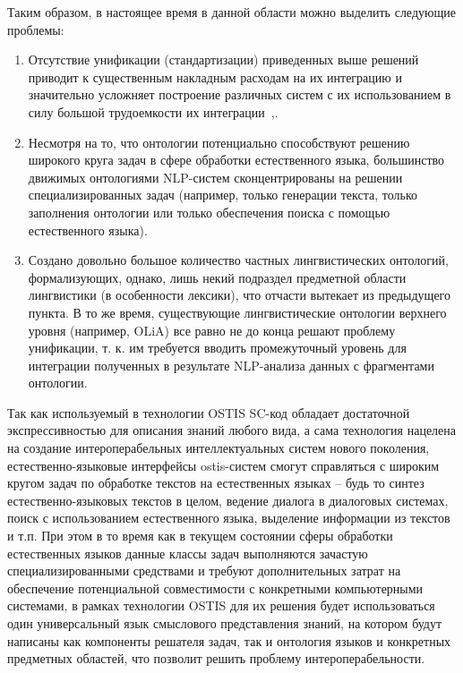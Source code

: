 Таким образом, в настоящее время в данной области можно выделить следующие проблемы:
\begin{enumerate}
    \item Отсутствие унификации (стандартизации) приведенных выше решений приводит к существенным накладным расходам на их интеграцию и значительно усложняет построение различных систем с их использованием в силу большой трудоемкости их интеграции~\cite{Standart2021},\cite{GolenkovProblems2021}.
    \item Несмотря на то, что онтологии потенциально способствуют решению широкого круга задач в сфере обработки естественного языка, большинство движимых онтологиями NLP-систем сконцентрированы на решении специализированных задач (например, только генерации текста, только заполнения онтологии или только обеспечения поиска с помощью естественного языка).
    \item Создано довольно большое количество частных лингвистических онтологий, формализующих, однако, лишь некий подраздел предметной области лингвистики (в особенности лексики), что отчасти вытекает из предыдущего пункта.
    В то же время, существующие лингвистические онтологии верхнего уровня (например, OLiA) все равно не до конца решают проблему унификации, т. к. им требуется вводить промежуточный уровень для интеграции полученных в результате NLP-анализа данных с фрагментами онтологии.
\end{enumerate}

Так как используемый в технологии OSTIS SC-код обладает достаточной экспрессивностью для описания знаний любого вида, а сама технология нацелена на создание интероперабельных интеллектуальных систем нового поколения, естественно-языковые интерфейсы ostis-систем смогут справляться с широким кругом задач по обработке текстов на естественных языках -- будь то синтез естественно-языковых текстов в целом, ведение диалога в диалоговых системах, поиск с использованием естественного языка, выделение информации из текстов и т.п. При этом в то время как в текущем состоянии сферы обработки естественных языков данные классы задач выполняются зачастую специализированными средствами и требуют дополнительных затрат на обеспечение потенциальной совместимости с конкретными компьютерными системами, в рамках технологии OSTIS для их решения будет использоваться один универсальный язык смыслового представления знаний, на котором будут написаны как компоненты решателя задач, так и онтология языков и конкретных предметных областей, что позволит решить проблему интероперабельности.

